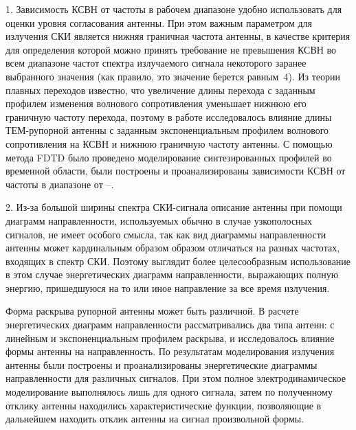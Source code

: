 1. Зависимость КСВН от частоты в рабочем диапазоне удобно использовать для оценки
уровня согласования антенны. При этом важным параметром для излучения СКИ
является нижняя граничная частота антенны, в качестве критерия для определения
которой можно принять требование не превышения КСВН во всем диапазоне частот
спектра излучаемого сигнала некоторого заранее выбранного значения (как правило,
это значение берется равным~4). Из теории плавных переходов известно, что
увеличение длины перехода с заданным профилем изменения волнового сопротивления
уменьшает нижнюю его граничную частоту перехода, поэтому в работе исследовалось
влияние длины ТЕМ-рупорной антенны с заданным экспоненциальным профилем
волнового сопротивления на КСВН и нижнюю граничную частоту антенны. С помощью
метода FDTD было проведено моделирование синтезированных профилей во временной
области, были построены и проанализированы зависимости КСВН от частоты
в диапазоне от --.

2. Из-за большой ширины спектра СКИ-сигнала описание антенны
при помощи диаграмм направленности, используемых обычно в случае узкополосных
сигналов, не имеет особого смысла, так как вид диаграммы направленности антенны
может кардинальным образом образом отличаться на разных частотах, входящих
в спектр СКИ. Поэтому выглядит более целесообразным использование в этом случае
энергетических диаграмм направленности, выражающих полную энергию, пришедшуюся
на то или иное направление за все время излучения.

Форма раскрыва рупорной антенны может быть различной. В расчете энергетических
диаграмм направленности рассматривались два типа антенн: с линейным
и экспоненциальным профилем раскрыва, и исследовалось влияние формы антенны
на направленность. По результатам моделирования излучения антенны были построены
и проанализированы энергетические диаграммы направленности для различных
сигналов. При этом полное электродинамическое моделирование выполнялось лишь
для одного сигнала, затем по полученному отклику антенны находились
характеристические функции, позволяющие в дальнейшем находить отклик антенны
на сигнал произвольной формы.
